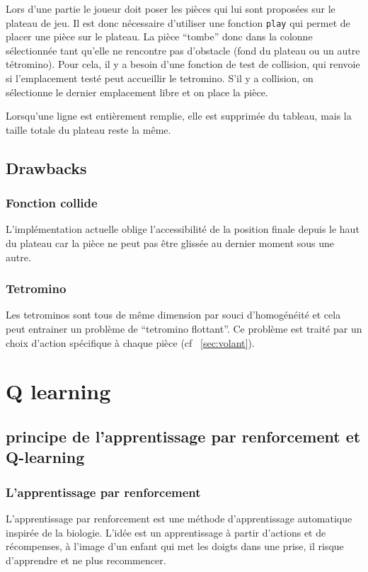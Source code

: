 \documentclass{report}
\begin{document}
Lors d'une partie le joueur doit poser les pièces qui lui sont proposées sur
le plateau de jeu. Il est donc nécessaire d'utiliser une fonction \texttt{play}
qui permet de placer une pièce sur le plateau. La pièce ``tombe'' donc dans la
colonne sélectionnée tant qu'elle ne rencontre pas d'obstacle (fond du plateau
ou un autre tétromino). Pour cela, il y a besoin d'une fonction de test de
collision, qui renvoie si l'emplacement testé peut accueillir le tetromino.
S'il y a collision, on sélectionne le dernier emplacement libre et on place la
pièce.

Lorsqu'une ligne est entièrement remplie, elle est supprimée du tableau, mais
la taille totale du plateau reste la même.

\section{Drawbacks}
\subsection{Fonction collide}
L'implémentation actuelle oblige l'accessibilité de la position finale depuis
le haut du plateau car la pièce ne peut pas être glissée au dernier moment
sous une autre.
\subsection{Tetromino}
Les tetrominos sont tous de même dimension par souci d'homogénéité et cela
peut entrainer un problème de ``tetromino flottant''. Ce problème est traité par
un choix d'action spécifique à chaque pièce (cf ~\ref{sec:volant}).


\chapter{Q learning}

\section{principe de l'apprentissage par renforcement et Q-learning}
\subsection{L'apprentissage par renforcement}

L'apprentissage par renforcement est une méthode d'apprentissage automatique
inspirée de la biologie. L'idée est un apprentissage à partir d'actions et
de récompenses, à l'image d'un enfant qui met les doigts dans une prise, il
risque d'apprendre et ne plus recommencer.
\end{document}
